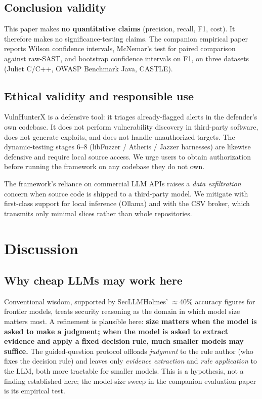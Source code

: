 \documentclass[11pt,a4paper]{article}
\begin{document}
\subsection{Conclusion validity}

This paper makes \textbf{no quantitative claims} (precision, recall,
F1, cost). It therefore makes no significance-testing claims. The
companion empirical paper reports Wilson confidence intervals,
McNemar's test for paired comparison against raw-SAST, and bootstrap
confidence intervals on F1, on three datasets (Juliet C/C++, OWASP
Benchmark Java, CASTLE).

\subsection{Ethical validity and responsible use}

VulnHunterX is a defensive tool: it triages already-flagged alerts in
the defender's own codebase. It does not perform vulnerability
discovery in third-party software, does not generate exploits, and
does not handle unauthorized targets. The dynamic-testing stages 6--8
(libFuzzer / Atheris / Jazzer harnesses) are likewise defensive and
require local source access. We urge users to obtain authorization
before running the framework on any codebase they do not own.

The framework's reliance on commercial LLM APIs raises a \emph{data
exfiltration} concern when source code is shipped to a third-party
model. We mitigate with first-class support for local inference
(Ollama) and with the CSV broker, which transmits only minimal slices
rather than whole repositories.

\section{Discussion}
\label{sec:discussion}

\subsection{Why cheap LLMs may work here}

Conventional wisdom, supported by SecLLMHolmes' $\approx$40\% accuracy
figures for frontier models, treats security reasoning as the domain
in which model size matters most. A refinement is plausible here:
\textbf{size matters when the model is asked to make a judgment; when
the model is asked to extract evidence and apply a fixed decision
rule, much smaller models may suffice.} The guided-question protocol
offloads \emph{judgment} to the rule author (who fixes the decision
rule) and leaves only \emph{evidence extraction} and \emph{rule
application} to the LLM, both more tractable for smaller models. This
is a hypothesis, not a finding established here; the model-size sweep
in the companion evaluation paper is its empirical test.
\end{document}
